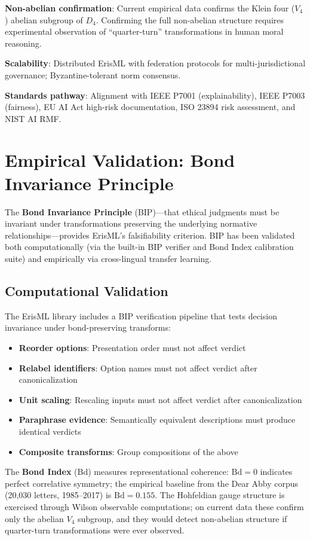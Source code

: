 \documentclass[conference]{IEEEtran}
\begin{document}
\textbf{Non-abelian confirmation}: Current empirical data confirms the Klein four ($V_4$) abelian subgroup of $D_4$. Confirming the full non-abelian structure requires experimental observation of ``quarter-turn'' transformations in human moral reasoning.

\textbf{Scalability}: Distributed ErisML with federation protocols for multi-jurisdictional governance; Byzantine-tolerant norm consensus.

\textbf{Standards pathway}: Alignment with IEEE P7001 (explainability), IEEE P7003 (fairness), EU AI Act high-risk documentation, ISO 23894 risk assessment, and NIST AI RMF.

\section{Empirical Validation: Bond Invariance Principle}
\label{sec:empirical}

The \textbf{Bond Invariance Principle} (BIP)---that ethical judgments must be invariant under transformations preserving the underlying normative relationships---provides ErisML's falsifiability criterion. BIP has been validated both computationally (via the built-in BIP verifier and Bond Index calibration suite) and empirically via cross-lingual transfer learning.

\subsection{Computational Validation}

The ErisML library includes a BIP verification pipeline that tests decision invariance under bond-preserving transforms:

\begin{itemize}
\item \textbf{Reorder options}: Presentation order must not affect verdict
\item \textbf{Relabel identifiers}: Option names must not affect verdict after canonicalization
\item \textbf{Unit scaling}: Rescaling inputs must not affect verdict after canonicalization
\item \textbf{Paraphrase evidence}: Semantically equivalent descriptions must produce identical verdicts
\item \textbf{Composite transforms}: Group compositions of the above
\end{itemize}

The \textbf{Bond Index} ($\mathrm{Bd}$) measures representational coherence: $\mathrm{Bd} = 0$ indicates perfect correlative symmetry; the empirical baseline from the Dear Abby corpus (20,030 letters, 1985--2017) is $\mathrm{Bd} = 0.155$. The Hohfeldian gauge structure is exercised through Wilson observable computations; on current data these confirm only the abelian $V_4$ subgroup, and they would detect non-abelian structure if quarter-turn transformations were ever observed.
\end{document}
